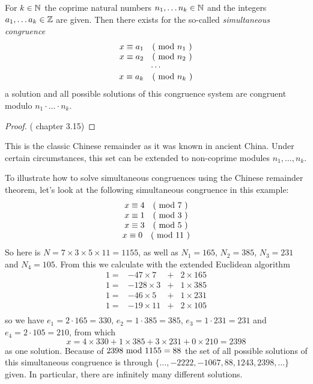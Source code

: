 \begin{theorem} 
For  $ k \in \mathbb{N} $ the coprime natural numbers $ n_1, \ldots n_k \in \mathbb{N} $ and the integers $ a_1, \ldots a_k \in \mathbb{Z} $ are given. Then there exists for the so-called \textit{simultaneous congruence}
\begin{equation}
\begin{array}{c}
x \equiv a_1 \quad \text{( mod } n_1 \text{ )} \\
x \equiv a_2 \quad \text{( mod } n_2 \text{ )} \\
\cdots \\
x \equiv a_k \quad \text{( mod } n_k \text{ )} \\
\end{array}
\end{equation}
a solution and all possible solutions of this congruence system are congruent modulo
$ n_1 \cdot \ldots \cdot n_k $.
\end{theorem}
\begin{proof} (\cite{JB} chapter 3.15)
\end{proof}
\begin{remark}
This is the classic Chinese remainder as it was known in ancient China. Under certain circumstances, this set can be extended to non-coprime modules $ n_1, \ldots, n_k $.
\end{remark}
\begin{example} To illustrate how to solve simultaneous congruences using the Chinese remainder theorem, let's look at the following simultaneous congruence in this example:
$$
\begin{array}{c}
x \equiv 4 \quad \text{( mod } 7 \text{ )} \\
x \equiv 1 \quad \text{( mod } 3 \text{ )} \\
x \equiv 3 \quad \text{( mod } 5 \text{ )} \\
x \equiv 0 \quad \text{( mod } 11 \text{ )} \\
\end{array}
$$
So here is $ N = 7 \times 3 \times 5 \times 11 = 1155 $, as well as
$ N_1 = 165 $, $ N_2 = 385 $, $ N_3 = 231 $ and $ N_4 = 105 $. From this we calculate with the extended Euclidean algorithm
$$
\begin{array}{cccc}
 1 = & -47 \times 7 & + & 2 \times 165 \\
 1 = & -128 \times 3 & + & 1 \times 385 \\
 1 = & -46 \times 5 & + & 1 \times 231 \\
 1 = & -19 \times 11 & + & 2 \times 105 \\
\end{array}
$$
so we have
$ e_1 = 2 \cdot 165 = 330 $, $ e_2 = 1 \cdot 385 = 385 $, $ e_3 = 1 \cdot 231 = 231 $ and $ e_4 = 2 \cdot 105 = 210 $, from which
$$
x = 4 \times 330 + 1 \times 385 + 3 \times 231 + 0 \times 210 = 2398
$$
as one solution. Because of $ 2398 \text{ mod } 1155 = 88 $ the set of all possible solutions of this simultaneous congruence is through
$ \{\ldots, -2222, -1067,88,1243, 2398, \ldots \} $ given. In particular, there are infinitely many different solutions.
\end{example}

